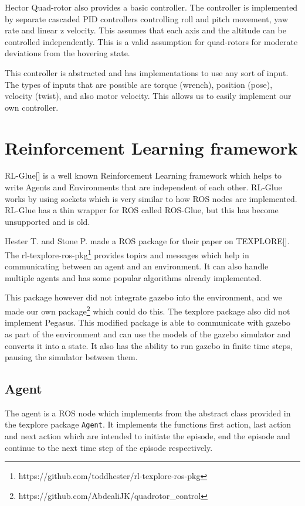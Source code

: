 \documentclass[BTech]{iitmdiss}
\begin{document}
Hector Quad-rotor also provides a basic controller. The controller is implemented by separate cascaded PID controllers controlling roll and pitch movement, yaw rate and linear z velocity. This assumes that each axis and the altitude can be controlled independently. This is a valid assumption for quad-rotors for moderate deviations from the hovering state.

This controller is abstracted and has implementations to use any sort of input. The types of inputs that are possible are torque (wrench), position (pose), velocity (twist), and also motor velocity. This allows us to easily implement our own controller.

\section{Reinforcement Learning framework}

RL-Glue[] is a well known Reinforcement Learning framework which helps to write Agents and Environments that are independent of each other. RL-Glue works by using sockets which is very similar to how ROS nodes are implemented. RL-Glue has a thin wrapper for ROS called ROS-Glue, but this has become unsupported and is old.

Hester T. and Stone P. made a ROS package for their paper on TEXPLORE[]. The rl-texplore-ros-pkg\footnote{https://github.com/toddhester/rl-texplore-ros-pkg} provides topics and messages which help in communicating between an agent and an environment. It can also handle multiple agents and has some popular algorithms already implemented.

This package however did not integrate gazebo into the environment, and we made our own package\footnote{https://github.com/AbdealiJK/quadrotor\_control} which could do this. The texplore package also did not implement Pegasus. This modified package is able to communicate with gazebo as part of the environment and can use the models of the gazebo simulator and converts it into a state. It also has the ability to run gazebo in finite time steps, pausing the simulator between them.

\subsection*{Agent}

The agent is a ROS node which implements from the abstract class provided in the texplore package \texttt{Agent}. It implements the functions first action, last action and next action which are intended to initiate the episode, end the episode and continue to the next time step of the episode respectively.
\end{document}
